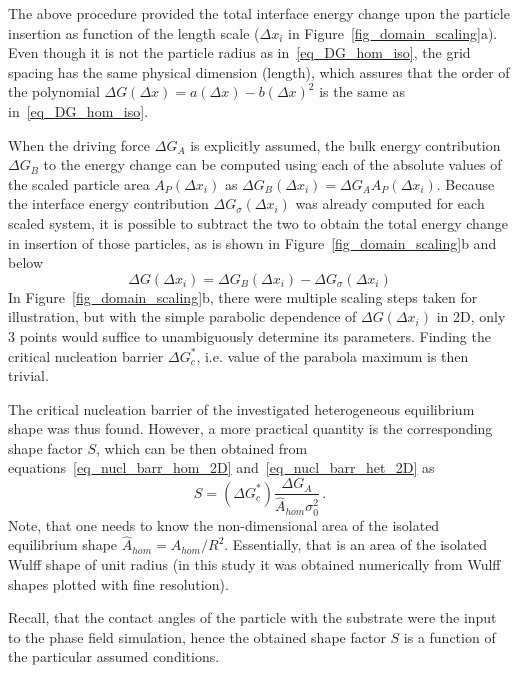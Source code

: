 The above procedure provided the total interface energy change upon the particle insertion as function of the length scale ($\Delta x_i$ in Figure~\ref{fig_domain_scaling}a). Even though it is not the particle radius as in~\eqref{eq_DG_hom_iso}, the grid spacing has the same physical dimension (length), which assures that the order of the polynomial $\Delta G(\Delta x) = a(\Delta x) - b(\Delta x)^2$ is the same as in~\eqref{eq_DG_hom_iso}.

When the driving force $\Delta G_A$ is explicitly assumed, the bulk energy contribution $\Delta G_B$ to the energy change can be computed using each of the absolute values of the scaled particle area $A_P(\Delta x_i)$ as $\Delta G_B(\Delta x_i)=\Delta G_A A_P(\Delta x_i)$. Because the interface energy contribution $\Delta G_\sigma(\Delta x_i)$ was already computed for each scaled system, it is possible to subtract the two to obtain the total energy change in insertion of those particles, as is shown in Figure~\ref{fig_domain_scaling}b and below
\begin{equation}
	\Delta G(\Delta x_i) = \Delta G_B(\Delta x_i) - \Delta G_\sigma(\Delta x_i)
\end{equation}
 In Figure~\ref{fig_domain_scaling}b, there were multiple scaling steps taken for illustration, but with the simple parabolic dependence of $\Delta G(\Delta x_i)$ in 2D, only 3 points would suffice to unambiguously determine its parameters. Finding the critical nucleation barrier $\Delta G^*_c$, i.e. value of the parabola maximum is then trivial. 

The critical nucleation barrier of the investigated heterogeneous equilibrium shape was thus found. However, a more practical quantity is the corresponding shape factor $S$, which can be then obtained from equations~\eqref{eq_nucl_barr_hom_2D} and~\eqref{eq_nucl_barr_het_2D} as
\begin{equation} \label{eq_NPA_PF_formula}
	S = (\Delta G_c^*)\frac{\Delta G_A}{\hat{A}_{hom}\sigma_0^2} \,.
\end{equation}
Note, that one needs to know the non-dimensional area of the isolated equilibrium shape $\hat{A}_{hom}=A_{hom}/R^2$. Essentially, that is an area of the isolated Wulff shape of unit radius (in this study it was obtained numerically from Wulff shapes plotted with fine resolution).

Recall, that the contact angles of the particle with the substrate were the input to the phase field simulation, hence the obtained shape factor $S$ is a function of the particular assumed conditions. 


